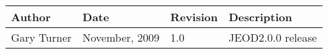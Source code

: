 %
%
% 
%



\begin{tabular}{||l|l|l|l|} \hline
 {\bf Author} & {\bf Date} &  {\bf Revision} & {\bf Description} \\ \hline \hline
 Gary Turner & November, 2009 & 1.0  & JEOD2.0.0 release \\ \hline
\end{tabular}
